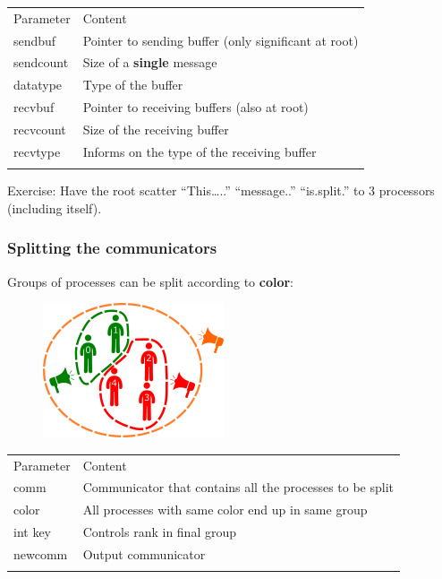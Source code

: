 \begin{longtable}[c]{@{}ll@{}}
\toprule\addlinespace
Parameter & Content
\\\addlinespace
\midrule\endhead
sendbuf & Pointer to sending buffer (only significant at root)
\\\addlinespace
sendcount & Size of a \textbf{single} message
\\\addlinespace
datatype & Type of the buffer
\\\addlinespace
recvbuf & Pointer to receiving buffers (also at root)
\\\addlinespace
recvcount & Size of the receiving buffer
\\\addlinespace
recvtype & Informs on the type of the receiving buffer
\\\addlinespace
\bottomrule
\end{longtable}

Exercise: Have the root scatter ``This\ldots{}..'' ``message..''
``is.split.'' to 3 processors (including itself).

\subsubsection{Splitting the
communicators}\label{splitting-the-communicators}

Groups of processes can be split according to \textbf{color}:

\begin{figure}[htbp]
\centering
\includegraphics{06MPI/figures/split.png}
\end{figure}

\begin{Shaded}
\begin{Highlighting}[]
   
\end{Highlighting}
\end{Shaded}

\begin{longtable}[c]{@{}ll@{}}
\toprule\addlinespace
Parameter & Content
\\\addlinespace
\midrule\endhead
comm & Communicator that contains all the processes to be split
\\\addlinespace
color & All processes with same color end up in same group
\\\addlinespace
int key & Controls rank in final group
\\\addlinespace
newcomm & Output communicator
\\\addlinespace
\bottomrule
\end{longtable}

